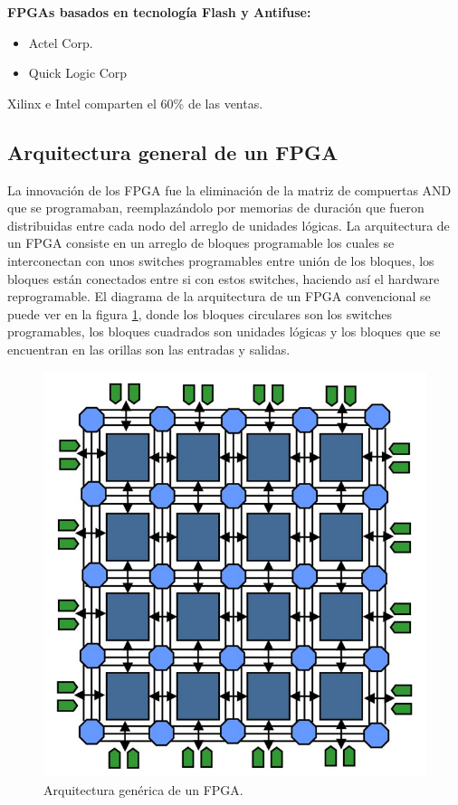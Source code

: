 \documentclass[twoside,spanish,ESP,MSc]{plantillaLabUPV}
\theoremstyle{definition}
\newcommand{\f}{FPGA }
\newcommand{\fs}{FPGAs }
\begin{document}
\textbf{\fs basados en tecnología Flash y Antifuse:}

\begin{itemize}
\itemsep 0em
\item Actel Corp.
\item Quick Logic Corp
\end{itemize}

Xilinx e Intel comparten el 60\% de las ventas.


\subsection{Arquitectura general de un FPGA}
La innovación de los FPGA fue la eliminación de la matriz de compuertas AND que se programaban, reemplazándolo por memorias de duración que fueron distribuidas entre cada nodo del arreglo de unidades lógicas. La arquitectura de un \f consiste en un arreglo de bloques programable los cuales se interconectan con unos switches programables entre unión de los bloques, los bloques están conectados entre si con estos switches, haciendo así el hardware reprogramable. El diagrama de la arquitectura de un \f convencional se puede ver en la figura \ref{arqf}, donde los bloques circulares son los switches programables, los bloques cuadrados son unidades lógicas y los bloques que se encuentran en las orillas son las entradas y salidas. 

\begin{figure}[h]
\centering
\includegraphics[scale=0.3]{ima/arqf.png}
\caption{Arquitectura genérica de un FPGA.%
\label{arqf}}
\end{figure}
\end{document}
